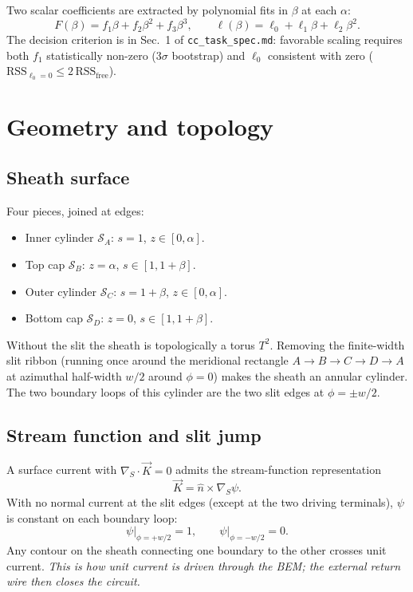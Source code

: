 \documentclass[11pt]{article}
\begin{document}
Two scalar coefficients are extracted by polynomial fits in $\beta$ at
each $\alpha$:
\begin{equation}
F(\beta)=f_1\beta+f_2\beta^2+f_3\beta^3,\qquad
\ell(\beta)=\ell_0+\ell_1\beta+\ell_2\beta^2.
\end{equation}
The decision criterion is in Sec.~1 of \texttt{cc\_task\_spec.md}:
favorable scaling requires both $f_1$ statistically non-zero (3$\sigma$
bootstrap) and $\ell_0$ consistent with zero
($\mathrm{RSS}_{\ell_0=0}\le 2\,\mathrm{RSS}_{\mathrm{free}}$).

\section{Geometry and topology}
\label{sec:geom}

\subsection{Sheath surface}
Four pieces, joined at edges:
\begin{itemize}
\item Inner cylinder $\mathcal S_A$: $s=1$, $z\in[0,\alpha]$.
\item Top cap $\mathcal S_B$: $z=\alpha$, $s\in[1,1+\beta]$.
\item Outer cylinder $\mathcal S_C$: $s=1+\beta$, $z\in[0,\alpha]$.
\item Bottom cap $\mathcal S_D$: $z=0$, $s\in[1,1+\beta]$.
\end{itemize}
Without the slit the sheath is topologically a torus $T^2$. Removing the
finite-width slit ribbon (running once around the meridional rectangle
$A\!\to\! B\!\to\! C\!\to\! D\!\to\! A$ at azimuthal half-width $w/2$
around $\phi=0$) makes the sheath an annular cylinder. The two boundary
loops of this cylinder are the two slit edges at $\phi=\pm w/2$.

\subsection{Stream function and slit jump}
A surface current with $\nabla_S\cdot\vec K=0$ admits the stream-function
representation
\begin{equation}
\vec K=\hat n\times\nabla_S\psi.
\end{equation}
With no normal current at the slit edges (except at the two driving
terminals), $\psi$ is constant on each boundary loop:
\begin{equation}
\psi\big|_{\phi=+w/2}=1,\qquad \psi\big|_{\phi=-w/2}=0.
\end{equation}
Any contour on the sheath connecting one boundary to the other crosses
unit current. \emph{This is how unit current is driven through the BEM;
the external return wire then closes the circuit.}
\end{document}
